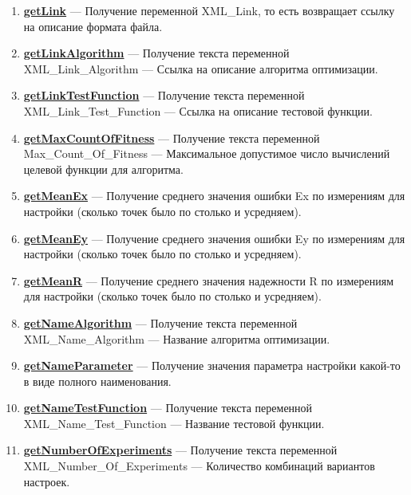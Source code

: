 \begin{enumerate}
\item \textbf{\hyperref[getLink]{getLink}} --- Получение переменной XML\_Link, то есть возвращает ссылку на описание формата файла.

\item \textbf{\hyperref[getLinkAlgorithm]{getLinkAlgorithm}} --- Получение текста переменной  XML\_Link\_Algorithm --- Ссылка на описание алгоритма оптимизации.

\item \textbf{\hyperref[getLinkTestFunction]{getLinkTestFunction}} --- Получение текста переменной  XML\_Link\_Test\_Function --- Ссылка на описание тестовой функции.

\item \textbf{\hyperref[getMaxCountOfFitness]{getMaxCountOfFitness}} --- Получение текста переменной  Max\_Count\_Of\_Fitness --- Максимальное допустимое число вычислений целевой функции для алгоритма.

\item \textbf{\hyperref[getMeanEx]{getMeanEx}} --- Получение среднего значения ошибки Ex по измерениям для настройки (сколько точек было по столько и усредняем).

\item \textbf{\hyperref[getMeanEy]{getMeanEy}} --- Получение среднего значения ошибки Ey по измерениям для настройки (сколько точек было по столько и усредняем).

\item \textbf{\hyperref[getMeanR]{getMeanR}} --- Получение среднего значения надежности R по измерениям для настройки (сколько точек было по столько и усредняем).

\item \textbf{\hyperref[getNameAlgorithm]{getNameAlgorithm}} --- Получение текста переменной  XML\_Name\_Algorithm --- Название алгоритма оптимизации.

\item \textbf{\hyperref[getNameParameter]{getNameParameter}} --- Получение значения параметра настройки какой-то в виде полного наименования.

\item \textbf{\hyperref[getNameTestFunction]{getNameTestFunction}} --- Получение текста переменной  XML\_Name\_Test\_Function --- Название тестовой функции.

\item \textbf{\hyperref[getNumberOfExperiments]{getNumberOfExperiments}} --- Получение текста переменной  XML\_Number\_Of\_Experiments --- Количество комбинаций вариантов настроек.


\end{enumerate}
